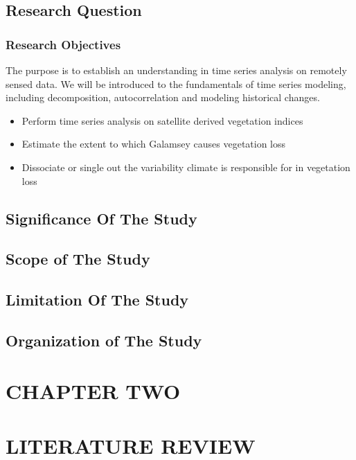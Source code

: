 \documentclass[12pt,a4paper]{article}
\begin{document}
\begin{flushleft}
		  \subsection{Research  Question}
		  \subsubsection{Research Objectives}
		  The purpose is to establish an understanding in time series analysis on remotely sensed data. We will be introduced to the fundamentals of time series modeling, including decomposition, autocorrelation and modeling historical changes.
		  \begin{itemize}
		  	\item  Perform time series analysis on satellite derived vegetation indices
		  	
		  	\item  Estimate the extent to which Galamsey causes vegetation loss
		  	
		  	\item  Dissociate or single out the variability climate is responsible for in vegetation loss
		  \end{itemize}
		  \subsection{Significance Of The  Study}
		  \subsection{Scope of The  Study}
		  \subsection{Limitation Of  The Study }
		  \subsection{ Organization  of  The  Study}
		\section{CHAPTER  TWO}
		\section{LITERATURE REVIEW}

\end{flushleft}
\end{document}
